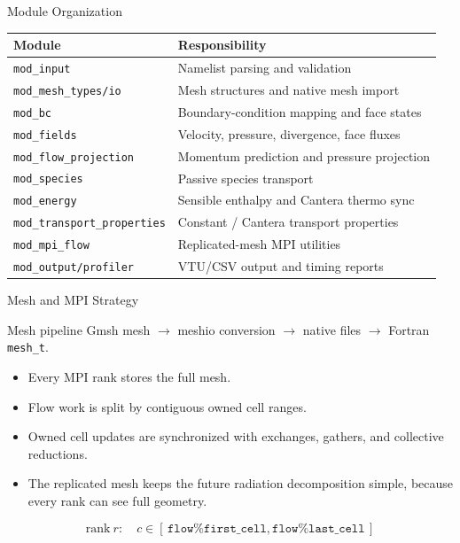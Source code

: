 \documentclass[aspectratio=169,11pt]{beamer}
\begin{document}
\begin{frame}{Module Organization}
  \begin{tabular}{@{}ll@{}}
    \toprule
    \textbf{Module} & \textbf{Responsibility} \\
    \midrule
    \texttt{mod\_input} & Namelist parsing and validation \\
    \texttt{mod\_mesh\_types/io} & Mesh structures and native mesh import \\
    \texttt{mod\_bc} & Boundary-condition mapping and face states \\
    \texttt{mod\_fields} & Velocity, pressure, divergence, face fluxes \\
    \texttt{mod\_flow\_projection} & Momentum prediction and pressure projection \\
    \texttt{mod\_species} & Passive species transport \\
    \texttt{mod\_energy} & Sensible enthalpy and Cantera thermo sync \\
    \texttt{mod\_transport\_properties} & Constant / Cantera transport properties \\
    \texttt{mod\_mpi\_flow} & Replicated-mesh MPI utilities \\
    \texttt{mod\_output/profiler} & VTU/CSV output and timing reports \\
    \bottomrule
  \end{tabular}
\end{frame}

\begin{frame}{Mesh and MPI Strategy}
  \begin{block}{Mesh pipeline}
    Gmsh mesh \(\rightarrow\) meshio conversion \(\rightarrow\) native files
    \(\rightarrow\) Fortran \texttt{mesh\_t}.
  \end{block}

  \begin{itemize}
    \item Every MPI rank stores the full mesh.
    \item Flow work is split by contiguous owned cell ranges.
    \item Owned cell updates are synchronized with exchanges, gathers, and
          collective reductions.
    \item The replicated mesh keeps the future radiation decomposition simple,
          because every rank can see full geometry.
  \end{itemize}

  \[
    \mathrm{rank}\ r:\quad c \in
    [\,\texttt{flow\%first\_cell},\texttt{flow\%last\_cell}\,]
  \]
\end{frame}
\end{document}
